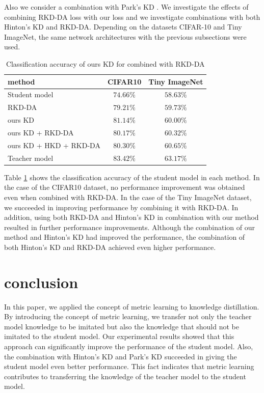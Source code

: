 \documentclass[conference]{IEEEtran}
\begin{document}
Also we consider a combination with Park's KD \cite{Park2019}.
We investigate the effects of combining RKD-DA loss with our loss and we investigate combinations with both Hinton's KD \cite{Hinton2015} and RKD-DA.
Depending on the datasets CIFAR-10 and Tiny ImageNet, the same network architectures with the previous subsections were used.

\begin{table}[ht]
\caption{Classification accuracy of ours KD for combined with RKD-DA}
\label{table:combinedRKD}
\begin{center}
\begin{tabular}{|l|c|c|}
\hline
method & CIFAR10 & Tiny ImageNet \\ \hline \hline
Student model &$74.66\%$  & $58.63\%$ \\ \hline
RKD-DA & $79.21\%$  & $59.73\%$   \\ \hline
ours KD & $\bm{81.14}\%$ & $60.00\%$   \\ \hline
ours KD + RKD-DA & $80.17\%$    &  $\bm{60.32}\%$     \\ \hline
ours KD + HKD + RKD-DA &  $80.30\%$   & $\bm{60.65}\%$      \\ \hline
Teacher model  & $83.42\%$  & $63.17\%$  \\
\hline
\end{tabular}
\end{center}
\end{table}

Table \ref{table:combinedRKD} shows the classification accuracy of the student model in each method.
In the case of the CIFAR10 dataset, no performance improvement was obtained even when combined with RKD-DA.
In the case of the Tiny ImageNet dataset, we succeeded in improving performance by combining it with RKD-DA.
In addition, using both RKD-DA and Hinton's KD in combination with our method resulted in further performance improvements.
Although the combination of our method and Hinton's KD had improved the performance, the combination of both Hinton's KD and RKD-DA achieved even higher performance.

\section{conclusion}
In this paper, we applied the concept of metric learning to knowledge distillation.
By introducing the concept of metric learning, we transfer not only the teacher model knowledge to be imitated but also the knowledge that should not be imitated to the student model.
Our experimental results showed that this approach can significantly improve the performance of the student model.
Also, the combination with Hinton's KD \cite{Hinton2015} and Park's KD \cite{Park2019} succeeded in giving the student model even better performance.
This fact indicates that metric learning contributes to transferring the knowledge of the teacher model to the student model.
\end{document}
